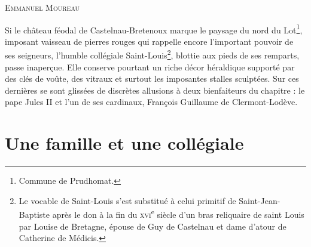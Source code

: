 \documentclass[12pt,twoside,openany]{book}
\newcommand{\PurhContributors}[1]{%
  \par\vspace{0.5\baselineskip}%
  {\normalsize\scshape #1\par}%
  \vspace{0.6\baselineskip}%
}
\begin{document}
\PurhContributors{Emmanuel Moureau}

Si le château féodal de Castelnau-Bretenoux marque le paysage du nord du Lot\footnote{Commune de Prudhomat.}, imposant vaisseau de pierres rouges qui rappelle encore l’important pouvoir de ses seigneurs, l’humble collégiale Saint-Louis\footnote{Le vocable de Saint-Louis s’est substitué à celui primitif de Saint-Jean-Baptiste après le don à la fin du \textsc{xvi}\textsuperscript{e} siècle d’un bras reliquaire de saint Louis par Louise de Bretagne, épouse de Guy de Castelnau et dame d’atour de Catherine de Médicis.}, blottie aux pieds de ses remparts, passe inaperçue. Elle conserve pourtant un riche décor héraldique supporté par des clés de voûte, des vitraux et surtout les imposantes stalles sculptées. Sur ces dernières se sont glissées de discrètes allusions à deux bienfaiteurs du chapitre : le pape Jules II et l’un de ses cardinaux, François Guillaume de Clermont-Lodève.

\section{Une famille et une collégiale}
\end{document}
